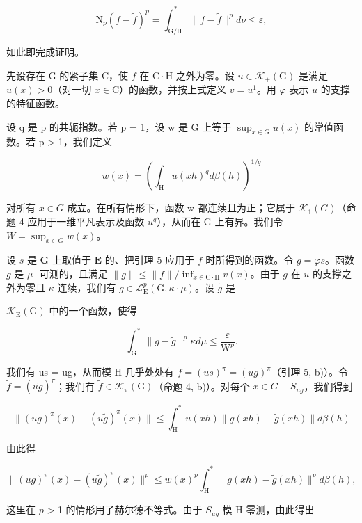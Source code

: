 \[
\mathrm{N} _ {p} (f - \widetilde {f}) ^ {p} = \int_ {\mathrm{G/H}} ^ {*} \| f - \widetilde {f} \| ^ {p} d \nu \leqslant \varepsilon ,
\]

如此即完成证明。

 先设存在 G 的紧子集 C，使 \(f\) 在 \(\mathrm{C} \cdot \mathrm{H}\) 之外为零。设 \(u \in \mathcal{K}_{+}(\mathrm{G})\) 是满足 \(u(x) > 0\)（对一切 \(x \in \mathrm{C}\)）的函数，并按上式定义 \(v = u^{1}\)。用 \(\varphi\) 表示 \(u\) 的支撑的特征函数。

设 q 是 p 的共轭指数。若 p = 1，设 w 是 G 上等于 \(\sup_{x \in G} u(x)\) 的常值函数。若 p \textgreater{} 1，我们定义

\[
w (x) = \left(\int_ {\mathrm{H}} u (x h) ^ {q} d \beta (h)\right) ^ {1 / q}
\]

 对所有 \(x \in G\) 成立。在所有情形下，函数 w 都连续且为正；它属于 \(\mathcal{K}_{1}(G)\)（命题 4 应用于一维平凡表示及函数 \(u^{q}\)），从而在 G 上有界。我们令 \(W = \sup_{x \in G} w(x)\)。

 设 \(s\) 是 \(\mathbf{G}\) 上取值于 \(\mathbf{E}\) 的、把引理 5 应用于 \(f\) 时所得到的函数。令 \(g = \varphi s\)。函数 \(g\) 是 \(\mu\) -可测的，且满足 \(\| g \| \leqslant \| f \| / \inf_{x \in \mathrm{C} \cdot \mathrm{H}} v(x)\)。由于 \(g\) 在 \(u\) 的支撑之外为零且 \(\kappa\) 连续，我们有 \(g \in \mathcal{L}_{\mathrm{E}}^{p}(\mathrm{G}, \kappa \cdot \mu)\)。设 \(\widetilde{g}\) 是

\(\mathcal{K}_{\mathrm{E}}(\mathrm{G})\) 中的一个函数，使得

\[
\int_ {\mathrm{G}} ^ {*} \| g - \widetilde {g} \| ^ {p} \kappa d \mu \leqslant \frac {\varepsilon}{\mathrm{W} ^ {p}}.
\]

我们有 us = ug，从而模 H 几乎处处有 \(f = (us)^{\pi} = (ug)^{\pi}\)（引理 5, b)）。令 \(\widetilde{f} = (u\widetilde{g})^{\pi}\)；我们有 \(\widetilde{f} \in \mathcal{K}_{\pi}(\mathrm{G})\)（命题 4, b)）。对每个 \(x \in G - S_{ug}\)，我们得到

\[
\| (u g) ^ {\pi} (x) - (u \widetilde {g}) ^ {\pi} (x) \| \leqslant \int_ {\mathrm{H}} ^ {*} u (x h) \| g (x h) - \widetilde {g} (x h) \| d \beta (h)
\]

由此得

\[
\| (u g) ^ {\pi} (x) - (u \widetilde {g}) ^ {\pi} (x) \| ^ {p} \leqslant w (x) ^ {p} \int_ {\mathrm{H}} ^ {*} \| g (x h) - \widetilde {g} (x h) \| ^ {p} d \beta (h),
\]

这里在 \( p \) \textgreater{} 1 的情形用了赫尔德不等式。由于 \(S_{ug}\) 模 H 零测，由此得出


